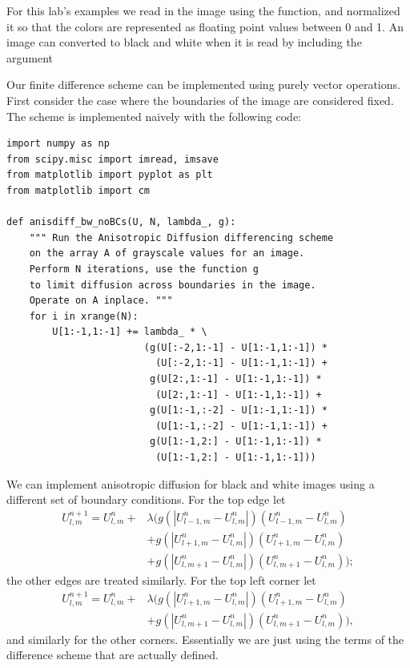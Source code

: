 For this lab's examples we read in the image using the  function, and normalized it so that the colors are represented as floating point values between 0 and 1.
An image can converted to black and white when it is read by including the argument 

Our finite difference scheme can be implemented using purely vector operations.
First consider the case where the boundaries of the image are considered fixed.
The scheme is implemented naively with the following code: 
\begin{lstlisting}
import numpy as np
from scipy.misc import imread, imsave
from matplotlib import pyplot as plt
from matplotlib import cm

def anisdiff_bw_noBCs(U, N, lambda_, g):
    """ Run the Anisotropic Diffusion differencing scheme
    on the array A of grayscale values for an image.
    Perform N iterations, use the function g
    to limit diffusion across boundaries in the image.
    Operate on A inplace. """
    for i in xrange(N):
        U[1:-1,1:-1] += lambda_ * \
                        (g(U[:-2,1:-1] - U[1:-1,1:-1]) *
                          (U[:-2,1:-1] - U[1:-1,1:-1]) +
                         g(U[2:,1:-1] - U[1:-1,1:-1]) *
                          (U[2:,1:-1] - U[1:-1,1:-1]) +
                         g(U[1:-1,:-2] - U[1:-1,1:-1]) *
                          (U[1:-1,:-2] - U[1:-1,1:-1]) +
                         g(U[1:-1,2:] - U[1:-1,1:-1]) *
                          (U[1:-1,2:] - U[1:-1,1:-1]))
\end{lstlisting}

We can implement anisotropic diffusion for black and white images using a different set of boundary conditions.
For the top edge let
\begin{align*}
U_{l,m}^{n+1} = U_{l,m}^n + & \lambda (g(|U_{l-1,m}^n - U_{l,m}^n|)(U_{l-1,m}^n - U_{l,m}^n) \\
					& + g(|U_{l+1,m}^n - U_{l,m}^n|)(U_{l+1,m}^n - U_{l,m}^n) \\
					& + g(|U_{l,m+1}^n - U_{l,m}^n|)(U_{l,m+1}^n - U_{l,m}^n));
\end{align*}
the other edges are treated similarly.
For the top left corner let
\begin{align*}
U_{l,m}^{n+1} = U_{l,m}^n + & \lambda (g(|U_{l+1,m}^n - U_{l,m}^n|)(U_{l+1,m}^n - U_{l,m}^n) \\
					& + g(|U_{l,m+1}^n - U_{l,m}^n|)(U_{l,m+1}^n - U_{l,m}^n)),
\end{align*}
and similarly for the other corners. 
Essentially we are just using the terms of the difference scheme that are actually defined.  

